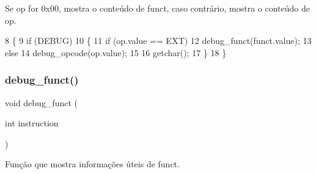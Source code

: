 Se op for 0x00, mostra o conteúdo de funct, caso contrário, mostra o conteúdo de op. 
\begin{DoxyCode}
8 \{
9     \textcolor{keywordflow}{if} (DEBUG)
10     \{
11         \textcolor{keywordflow}{if} (op.value == EXT)
12             debug_funct(funct.value);
13         \textcolor{keywordflow}{else}
14             debug_opcode(op.value);
15 
16         getchar();
17     \}
18 \}
\end{DoxyCode}
\mbox{\label{global_8c_a54cf8c1aeb3275e1a1af00b0f84efec1}} 
\subsubsection{debug\+\_\+funct()}
{\footnotesize\ttfamily void debug\+\_\+funct (\begin{DoxyParamCaption}\item[{int}]{instruction }\end{DoxyParamCaption})}



Função que mostra informações úteis de funct. 


